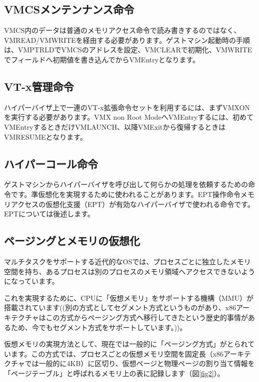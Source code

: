 \documentclass[a4j,12pt]{jarticle}
\begin{document}
\subsection*{VMCSメンテンナンス命令}
VMCS内のデータは普通のメモリアクセス命令で読み書きするのではなく、VMREAD/VMWRITEを経由する必要があります。ゲストマシン起動時の手順は、VMPTRLDでVMCSのアドレスを設定、VMCLEARで初期化、VMWRITEでフィールドへ初期値を書き込んでからVMEntryとなります。

\subsection*{VT-x管理命令}
ハイパーバイザ上で一連のVT-x拡張命令セットを利用するには、まずVMXONを実行する必要があります。VMX non Root ModeへVMEntryするには、初めてVMEntryするときだけVMLAUNCH、以降VMExitから復帰するときはVMRESUMEとなります。

\subsection*{ハイパーコール命令}
ゲストマシンからハイパーバイザを呼び出して何らかの処理を依頼するための命令です。準仮想化を実現するために使われることがあります。EPT操作命令メモリアクセスの仮想化支援（EPT）が有効なハイパーバイザで使われる命令です。EPTについては後述します。

\subsection*{ページングとメモリの仮想化}
マルチタスクをサポートする近代的なOSでは、プロセスごとに独立したメモリ空間を持ち、あるプロセスは別のプロセスのメモリ領域へアクセスできないようになっています。

これを実現するために、CPUに「仮想メモリ」をサポートする機構（MMU）が搭載されています((別の方式としてセグメント方式というものがあり、x86アーキテクチャはこの方式からページング方式へ移行してきたという歴史的事情があるため、今でもセグメント方式をサポートしています。))。

仮想メモリの実現方法として、現在では一般的に「ページング方式」がとられています。この方式では、プロセスごとの仮想メモリ空間を固定長（x86アーキテクチャでは一般的に4KB）に区切り、仮想ページと物理ページの割り当て情報を「ページテーブル」と呼ばれるメモリ上の表に記録します（図\ref{fig2}）。
\end{document}
